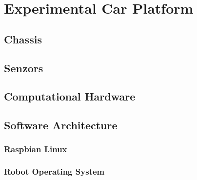 \chapter{Experimental Car Platform}

\section{Chassis}

\section{Senzors}

\section{Computational Hardware}

\section{Software Architecture}

\subsection{Raspbian Linux}

\subsection{Robot Operating System}